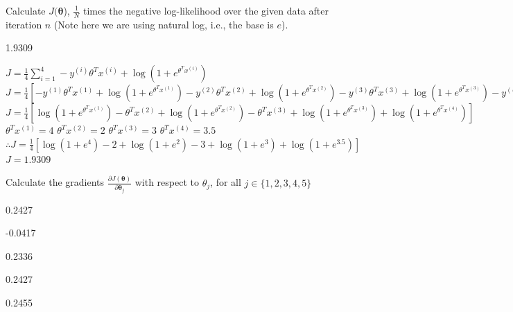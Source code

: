 \documentclass[11pt,addpoints,answers]{exam}
\newcommand{\thetav     }{\boldsymbol \theta     }
\begin{document}
\begin{questions}
    \question[2] Calculate $J(\thetav$), $\frac{1}{N}$ times the negative log-likelihood over the given data after iteration $n$ (Note here we are using natural log, i.e., the base is $e$). 
    
    \begin{your_solution}[title=$J(\thetav)$,height=2cm,width=3cm]
    1.9309
    \end{your_solution}
    
    \begin{your_solution}[title=Work,height=8cm,width=15.3cm]
    $J = \frac{1}{4}\sum\limits_{i = 1}^4 -y^{(i)} \theta^T x^{(i)} + \log(1 + e^{\theta^Tx^{(i)}})$\newline
    $J = \frac{1}{4}[-y^{(1)} \theta^T x^{(1)} + \log(1 + e^{\theta^Tx^{(1)}})-y^{(2)} \theta^T x^{(2)} + \log(1 + e^{\theta^Tx^{(2)}})-y^{(3)} \theta^T x^{(3)} + \log(1 + e^{\theta^Tx^{(3)}})-y^{(4)} \theta^T x^{(4)} + \log(1 + e^{\theta^Tx^{(4)}})]$\newline
    $J = \frac{1}{4}[\log(1 + e^{\theta^Tx^{(1)}})-\theta^T x^{(2)} + \log(1 + e^{\theta^Tx^{(2)}})-\theta^T x^{(3)} + \log(1 + e^{\theta^Tx^{(3)}}) + \log(1 + e^{\theta^Tx^{(4)}})]$\newline\newline
    $\theta^Tx^{(1)} = 4$\newline
    $\theta^Tx^{(2)} = 2$\newline
    $\theta^Tx^{(3)} = 3$\newline
    $\theta^Tx^{(4)} = 3.5$\newline
    $\therefore J = \frac{1}{4}[\log(1 + e^{4})-2 + \log(1 + e^{2}) - 3 + \log(1 + e^3) + \log(1 + e^{3.5})]$\newline
    $J = 1.9309$
    
    \end{your_solution}
    
    \clearpage
    
    \question[2] Calculate the gradients $\frac{\partial J(\thetav)}{\partial \thetav_j}$ with respect to $\theta_{j}$, for all $j \in \{1, 2, 3, 4, 5\}$

    \begin{your_solution}[title=$\partial J(\thetav)/\partial \thetav_1$,height=1.8cm,width=3cm]
    0.2427
    \end{your_solution}
    \begin{your_solution}[title=$\partial J(\thetav)/\partial \thetav_2$,height=1.8cm,width=3cm]
    -0.0417
    \end{your_solution}
    \begin{your_solution}[title=$\partial J(\thetav)/\partial \thetav_3$,height=1.8cm,width=3cm]
	0.2336
    \end{your_solution}
    \begin{your_solution}[title=$\partial J(\thetav)/\partial \thetav_4$,height=1.8cm,width=3cm]
    0.2427
    \end{your_solution}
    \begin{your_solution}[title=$\partial J(\thetav)/\partial \thetav_5$,height=1.8cm,width=3cm]
    0.2455
    \end{your_solution}
    

\end{questions}
\end{document}
